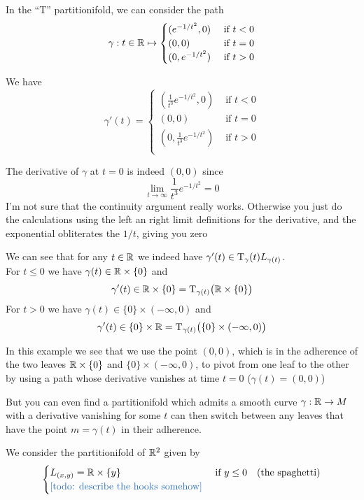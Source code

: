 	\begin{example}
		In the ``T'' partitionifold, we can consider the path
		$$
			\gamma: t \in \mathbb{R} \mapsto
			\begin{cases}
				(e^{-1/t^2}, 0)  &\text{ if } t < 0 \\
				(0, 0)           &\text{ if } t = 0 \\
				(0, e^{-1/t^2})  &\text{ if } t > 0 \\
			\end{cases}
		$$

		We have
		$$
			\gamma'(t) =
			\begin{cases}
				(\frac{1}{t^3} e^{-1/t^2}, 0)  &\text{ if } t < 0 \\
				(0, 0)                         &\text{ if } t = 0 \\
				(0, \frac{1}{t^3} e^{-1/t^2})  &\text{ if } t > 0 \\
			\end{cases}
		$$
		
		The derivative of $\gamma$ at $t=0$ is indeed $(0,0)$ since
		$$
			\lim_{t \to \infty} \frac{1}{t^3} e^{-1/t^2} = 0
		$$
		{\color{Red}I'm not sure that the continuity argument really works. Otherwise you just do the calculations using the left an right limit definitions for the derivative, and the exponential obliterates the $1/t$, giving you zero}

		We can see that for any $t \in \mathbb{R}$ we indeed have $\gamma'(t) \in \mathrm{T}_\gamma(t) L_{\gamma(t)}$. \\
		For $t \leq 0$ we have $\gamma(t) \in \mathbb{R} \times \{0\}$ and
		$$
			\gamma'(t) \in \mathbb{R} \times \{0\} = \mathrm{T}_{\gamma(t)}\big( \mathbb{R} \times \{0\} \big)
		$$
		For $t > 0$ we have $\gamma(t) \in \{0\} \times (-\infty, 0)$ and
		$$
			\gamma'(t) \in \{0\} \times \mathbb{R} = \mathrm{T}_{\gamma(t)}\big( \{0\} \times (-\infty, 0) \big)
		$$
	\end{example}

	In this example we see that we use the point $(0,0)$, which is in the adherence of the two leaves $\mathbb{R} \times \{0\}$ and $\{0\} \times (-\infty, 0)$, to pivot from one leaf to the other by using a path whose derivative vanishes at time $t=0$ ($\gamma(t) = (0,0)$)

	But you can even find a partitionifold which admits a smooth curve $\gamma: \mathbb{R} \to M$ with a derivative vanishing for some $t$ can then switch between any leaves that have the point $m = \gamma(t)$ in their adherence.

	\begin{example}
		We consider the partitionifold of $\mathbb{R}^2$ given by
		$$
		\begin{cases}
			L_{(x,y)} = \R \times \{y\}            &\text{ if } y \leq 0 \quad \text{(the spaghetti)} \\
			\text{\todo{describe the hooks somehow}}
		\end{cases}
		$$
	\end{example}

